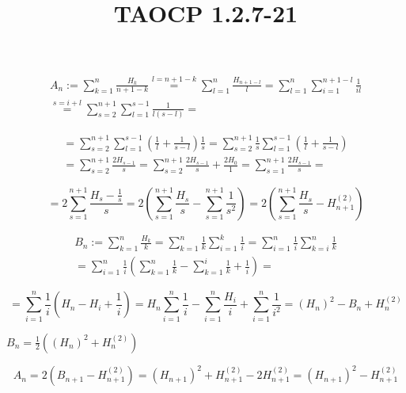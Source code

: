 \documentclass{article}
\title{TAOCP 1.2.7\mbox{-}21}
\begin{document}
\maketitle

\begin{multline*}
A_{n} := \sum_{k=1}^{n}\frac{H_{k}}{n+1-k} \overset{l = n + 1 - k}{=} \sum_{l=1}^{n} \frac{H_{n+1-l}}{l} = \sum_{l=1}^{n} \sum_{i=1}^{n+1-l}\frac{1}{il} \\
\overset{s=i+l}{=} \sum_{s=2}^{n+1}\sum_{l=1}^{s-1}\frac{1}{l(s-l)} =
\end{multline*}

\begin{multline*}
= \sum_{s=2}^{n+1}\sum_{l=1}^{s-1}(\frac{1}{l} + \frac{1}{s-l})\frac{1}{s} = \sum_{s=2}^{n+1}\frac{1}{s}\sum_{l=1}^{s-1}(\frac{1}{l} + \frac{1}{s-l}) \\
= \sum_{s=2}^{n+1}\frac{2H_{s-1}}{s} = \sum_{s=2}^{n+1}\frac{2H_{s-1}}{s} + \frac{2H_{0}}{1} = \sum_{s=1}^{n+1}\frac{2H_{s-1}}{s} =
\end{multline*}

\[ = 2 \sum_{s=1}^{n+1} \frac{H_{s} - \frac{1}{s}}{s} = 2 (\sum_{s=1}^{n+1} \frac{H_{s}}{s} - \sum_{s=1}^{n+1} \frac{1}{s^{2}}) = 2(\sum_{s=1}^{n+1} \frac{H_{s}}{s} - H_{n+1}^{(2)}) \]

\begin{multline*}
B_{n} := \sum_{k=1}^{n} \frac{H_{k}}{k} = \sum_{k=1}^{n}\frac{1}{k}\sum_{i=1}^{k} \frac{1}{i} = \sum_{i=1}^{n} \frac{1}{i}\sum_{k=i}^{n} \frac{1}{k} \\
= \sum_{i=1}^{n} \frac{1}{i}(\sum_{k=1}^{n} \frac{1}{k} - \sum_{k=1}^{i} \frac{1}{k} + \frac{1}{i}) =
\end{multline*}

\[ = \sum_{i=1}^{n} \frac{1}{i}(H_{n} - H_{i} + \frac{1}{i}) = H_{n} \sum_{i=1}^{n} \frac{1}{i} - \sum_{i=1}^{n} \frac{H_{i}}{i} + \sum_{i=1}^{n} \frac{1}{i^{2}} = {(H_{n})}^{2} - B_{n} + H_{n}^{(2)} \]

\( B_{n} = \frac{1}{2}({(H_{n})}^{2} + H_{n}^{(2)}) \)

\[ A_{n} = 2(B_{n+1} - H_{n+1}^{(2)}) = {(H_{n+1})}^{2} + H_{n+1}^{(2)} - 2H_{n+1}^{(2)} = {(H_{n+1})}^{2} - H_{n+1}^{(2)} \]
\end{document}
